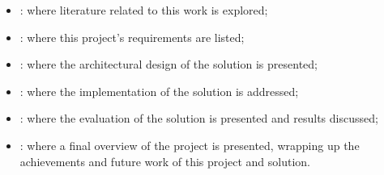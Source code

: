 \begin{itemize}
    \item {}: where literature related to this work is explored;
    \item {}: where this project's requirements are listed;
    \item {}: where the architectural design of the solution is presented;
    \item {}: where the implementation of the solution is addressed;
    \item {}: where the evaluation of the solution is presented and results discussed;
    \item {}: where a final overview of the project is presented, wrapping up the achievements and future work of this project and solution.
\end{itemize}
